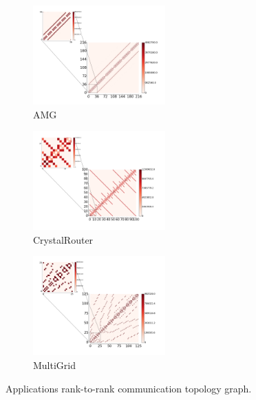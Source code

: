 

\begin{figure}[htp]
    \centering
    \begin{subfigure}[t]{0.32\textwidth}
        \centering
        \includegraphics[height=1.5in]{figs/appstudy/amg/amg_pip}
        \caption{AMG}
        \label{fig:amg-communication-topology}
    \end{subfigure}
    \begin{subfigure}[t]{0.32\textwidth}
        \centering
        \includegraphics[height=1.5in]{figs/appstudy/cr/cr_pip}
        \caption{CrystalRouter}
        \label{fig:cr-communication-topology}
    \end{subfigure}
    \begin{subfigure}[t]{0.32\textwidth}
        \centering
        \includegraphics[height=1.5in]{figs/appstudy/mg/mg_pip}
        \caption{MultiGrid}
        \label{fig:mg-communication-topology}
    \end{subfigure}
    \caption{Applications rank-to-rank communication topology graph.}
\end{figure}


